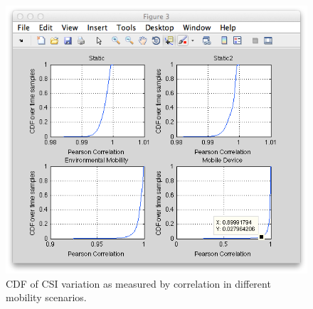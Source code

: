 \begin{figure}[htp]
	\centering
	\includegraphics[width=\textwidth]{figures/esnr/mobility_csi_cdf.png}
	\caption{\label{fig:mobility_csi_cdf}CDF of CSI variation as measured by correlation in different mobility scenarios.}
\end{figure}

